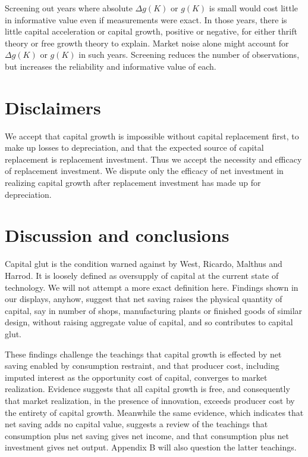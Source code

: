 \documentclass[a4paper,fleqn]{latex_styles/cas-sc}
\begin{document}
Screening out years where absolute \(\Delta g(K)\) or $g(K)$ is small would cost
little in informative value even if measurements were exact. In those
years, there is little capital acceleration or capital growth, positive or negative, for
either thrift theory or free growth theory to explain. Market noise
alone might account for \(\Delta g(K)\) or $g(K)$ in such years. Screening reduces
the number of observations, but increases the reliability and
informative value of each.

\hypertarget{disclaimers}{%
\section{Disclaimers}\label{disclaimers}}

We accept that capital growth is impossible without capital replacement first, to make up losses to depreciation, and that the expected source of capital replacement is replacement investment. Thus we accept the necessity and efficacy of replacement investment. We dispute only the efficacy of net investment in realizing capital growth after replacement investment has made up for depreciation.

\hypertarget{discussion-and-conclusions}{%
\section{Discussion and conclusions}\label{discussion-and-conclusions}}

Capital glut is the condition warned against by West, Ricardo, Malthus
and Harrod. It is loosely defined as oversupply of capital at the
current state of technology. We will not attempt a more exact definition
here. Findings shown in our displays, anyhow, suggest that net
saving raises the physical quantity of capital, say in number of
shops, manufacturing plants or finished goods of similar design, without
raising aggregate value of capital, and so contributes to capital glut.

These findings challenge the teachings that capital growth is effected
by net saving enabled by consumption restraint, and that producer
cost, including imputed interest as the opportunity cost of capital,
converges to market realization. Evidence suggests that all capital growth is free, and
consequently that market realization, in the presence of innovation,
exceeds producer cost by the entirety of capital growth. Meanwhile the same evidence, which indicates that net saving adds no capital value, suggests a review of the teachings that consumption plus net saving gives net income, and that consumption plus net investment gives net output. Appendix B will also question the latter teachings.
\end{document}
